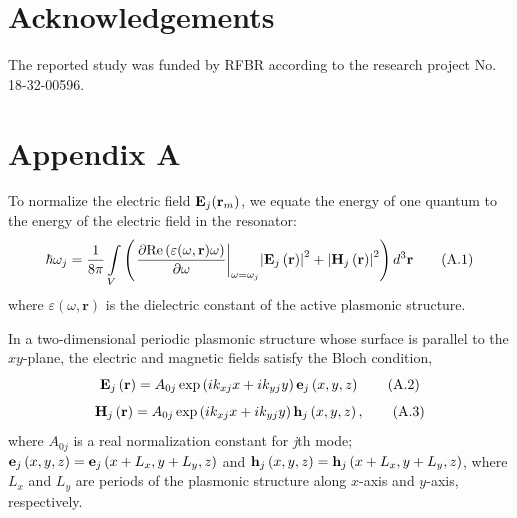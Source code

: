 \documentclass[aps,pra,amsmath,amssymb,onecolumn,superscriptaddress,showpacs,floatfix,]{revtex4-1}
\begin{document}
\section*{Acknowledgements}

The reported study was funded by RFBR according to the research project No. 18-32-00596.

\section*{Appendix A}
To normalize the electric field ${{\bf{E}}_j}({{\bf{r}}_m})$, we equate the energy of one quantum to the energy of the electric field in the resonator:
\begin{equation}
\hbar {\omega _j} = \frac{1}{{8\pi }}\int\limits_V {\left( {{{\left. {\frac{{\partial {\mathop{\rm Re}\nolimits} \left( {\varepsilon(\omega, \textbf{r}) \omega } \right)}}{{\partial \omega }}} \right|}_{\omega  = {\omega _j}}}{{\left| {{{\bf{E}}_j}\left( {\bf{r}} \right)} \right|}^2} + {{\left| {{{\bf{H}}_j}\left( {\bf{r}} \right)} \right|}^2}} \right){d^3}{\bf{r}}} \tag{A.1}
\end{equation}
where $\varepsilon (\omega, \textbf{r})$  is the dielectric constant of the active plasmonic structure.

In a two-dimensional periodic plasmonic structure whose surface is parallel to the $xy$-plane, the electric and magnetic fields satisfy the Bloch condition,
\begin{equation}
{{\bf{E}}_j}\left( {\bf{r}} \right) = {A_{0j}}\exp \left( {i{k_{xj}}x + i{k_{yj}}y} \right){{\bf{e}}_j}\left( {x,y,z} \right) \tag{A.2}
\end{equation}
\begin{equation}
{{\bf{H}}_j}\left( {\bf{r}} \right) = {A_{0j}}\exp \left( {i{k_{xj}}x + i{k_{yj}}y} \right){{\bf{h}}_j}\left( {x,y,z} \right), \tag{A.3}
\end{equation}
where $A_{0j}$ is a real normalization constant for \textit{j}th mode; ${{\bf{e}}_j}\left( {x,y,z} \right) = {{\bf{e}}_j}\left( {x + {L_x},y + {L_y},z} \right)$  and ${{\bf{h}}_j}\left( {x,y,z} \right) = {{\bf{h}}_j}\left( {x + {L_x},y + {L_y},z} \right)$, where $L_x$ and $L_y$ are periods of the plasmonic structure along $x$-axis and $y$-axis, respectively.
\end{document}
